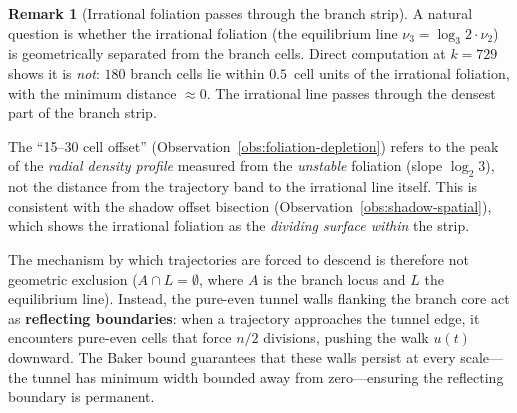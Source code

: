 \documentclass[11pt,a4paper]{article}
\theoremstyle{plain}
\theoremstyle{definition}
\newtheorem{remark}[theorem]{Remark}
\begin{document}
\begin{remark}[Irrational foliation passes through the branch strip]
\label{rem:foliation-through-strip}
    A natural question is whether the irrational foliation (the
    equilibrium line $\nu_3 = \log_3 2 \cdot \nu_2$) is geometrically
    separated from the branch cells.  Direct computation at $k = 729$
    shows it is \emph{not}: $180$ branch cells lie within $0.5$~cell
    units of the irrational foliation, with the minimum distance
    $\approx 0$.  The irrational line passes through the densest part
    of the branch strip.

    The ``15--30 cell offset'' (Observation~\ref{obs:foliation-depletion})
    refers to the peak of the \emph{radial density profile} measured
    from the \emph{unstable} foliation (slope $\log_2 3$), not the
    distance from the trajectory band to the irrational line itself.
    This is consistent with the shadow offset bisection
    (Observation~\ref{obs:shadow-spatial}), which shows the irrational
    foliation as the \emph{dividing surface within} the strip.

    The mechanism by which trajectories are forced to descend is
    therefore not geometric exclusion ($A \cap L = \emptyset$, where
    $A$ is the branch locus and $L$ the equilibrium line).
    Instead, the pure-even tunnel walls flanking the branch core act
    as \textbf{reflecting boundaries}: when a trajectory approaches
    the tunnel edge, it encounters pure-even cells that force $n/2$
    divisions, pushing the walk $u(t)$ downward.  The Baker bound
    guarantees that these walls persist at every scale---the tunnel
    has minimum width bounded away from zero---ensuring the reflecting
    boundary is permanent.
\end{remark}
\end{document}
